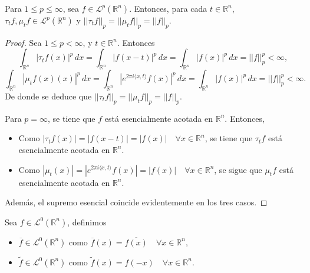 \begin{proposicion}
    Para $ 1\leq p \leq \infty$, sea $f \in \mathscr{L}^p(\mathbb{R}^n)$. Entonces, para cada  $t \in \mathbb{R}^n$,  $\tau_tf,\mu_tf \in \mathscr{L}^p(\mathbb{R}^n) $ y $||\tau_tf||_p = ||\mu_tf||_p = ||f||_p$.
\end{proposicion}
\begin{proof}
Sea $ 1\leq p < \infty$, y $t \in \mathbb{R}^n$. Entonces
    \begin{equation}
       \int_{\mathbb{R}^n} |\tau_tf(x)|^p  \, dx =\int_{\mathbb{R}^n} |f(x-t)|^p  \, dx =  \int_{\mathbb{R}^n} |f(x)|^p  \, dx = ||f||_p^p< \infty,
    \end{equation}
    \begin{equation}
        \int_{\mathbb{R}^n} |\mu_tf(x)(x)|^p  \, dx = \int_{\mathbb{R}^n} |e^{2 \pi i  \langle x, t \rangle}f(x)|^p  \, dx= \int_{\mathbb{R}^n} |f(x)|^p  \, dx = ||f||_p^p< \infty.
    \end{equation}
De donde se deduce que $||\tau_tf||_p = ||\mu_tf||_p = ||f||_p$.
\vspace{0.2cm}

\noindent Para $p= \infty$, se tiene que $f$ está esencialmente acotada en $\mathbb{R}^n$. Entonces, 
\begin{itemize}
    \item   Como $|\tau_t{f}(x)| = |f(x-t)| = |f(x)| \quad \forall x \in \mathbb{R}^n$, se tiene que $\tau_t{f}$ está esencialmente acotada en $\mathbb{R}^n$.
    \item Como $|\mu_t(x)| = |e^{2 \pi i  \langle x, t \rangle}f(x)|= |f(x)|  \quad \forall x \in \mathbb{R}^n$, se sigue que $\mu_t{f}$ está esencialmente acotada en $\mathbb{R}^n$.
\end{itemize} 
Además, el supremo esencial coincide evidentemente en los tres casos.
\end{proof}

\begin{definicion}
Sea $f \in \mathscr{L}^0(\mathbb{R}^n)$, definimos 
\begin{itemize}
    \item $\overline{f} \in \mathscr{L}^0(\mathbb{R}^n) $ como $\overline{f}(x)=\overline{f(x)} \quad \forall x \in \mathbb{R}^n,$
    \item $\widetilde{f} \in \mathscr{L}^0(\mathbb{R}^n) $ como $\widetilde{f}(x)=f(-x) \quad \forall x \in \mathbb{R}^n.$
\end{itemize}
\end{definicion}

